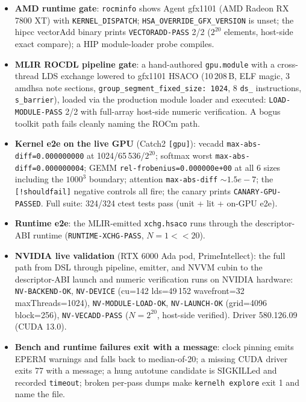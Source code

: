 \documentclass[10pt,twoside]{article}
\begin{document}
\begin{itemize}
  \item \textbf{AMD runtime gate}: \texttt{rocminfo} shows Agent gfx1101 (AMD Radeon RX
        7800 XT) with \texttt{KERNEL\_DISPATCH}; \texttt{HSA\_OVERRIDE\_GFX\_VERSION} is unset;
        the hipcc vectorAdd binary prints \texttt{VECTORADD-PASS} 2/2 ($2^{20}$ elements,
        host-side exact compare); a HIP module-loader probe compiles.
  \item \textbf{MLIR ROCDL pipeline gate}: a hand-authored \texttt{gpu.module} with a
        cross-thread LDS exchange lowered to gfx1101 HSACO (10\,208\,B, ELF magic, 3 amdhsa
        note sections, \texttt{group\_segment\_fixed\_size: 1024}, 8 \texttt{ds\_}
        instructions, \texttt{s\_barrier}), loaded via the production module loader and
        executed: \texttt{LOAD-MODULE-PASS} 2/2 with full-array host-side numeric
        verification. A bogus toolkit path fails cleanly naming the ROCm path.
  \item \textbf{Kernel e2e on the live GPU} (Catch2 \texttt{[gpu]}): vecadd
        \texttt{max-abs-diff=0.000000000} at 1024/65\,536/$2^{20}$; softmax worst
        \texttt{max-abs-diff=0.000000004}; GEMM \texttt{rel-frobenius=0.000000e+00} at all 6
        sizes including the $1000^3$ boundary; attention \texttt{max-abs-diff}
        $\sim 1.5e{-}7$; the \texttt{[!shouldfail]} negative controls all fire; the canary
        prints \texttt{CANARY-GPU-PASSED}. Full suite: 324/324 ctest tests pass (unit + lit
        + on-GPU e2e).
  \item \textbf{Runtime e2e}: the MLIR-emitted \texttt{xchg.hsaco} runs through the
        descriptor-ABI runtime (\texttt{RUNTIME-XCHG-PASS}, $N=1<<20$).
  \item \textbf{NVIDIA live validation} (RTX 6000 Ada pod, PrimeIntellect): the full path from
        DSL through pipeline, emitter, and NVVM cubin to the descriptor-ABI launch and numeric
        verification runs on NVIDIA hardware: \texttt{NV-BACKEND-OK}, \texttt{NV-DEVICE}
        (cu=142 lds=49\,152 wavefront=32 maxThreads=1024), \texttt{NV-MODULE-LOAD-OK},
        \texttt{NV-LAUNCH-OK} (grid=4096 block=256), \texttt{NV-VECADD-PASS} ($N{=}2^{20}$,
        host-side verified). Driver 580.126.09 (CUDA 13.0).
  \item \textbf{Bench and runtime failures exit with a message}: clock pinning emits EPERM
        warnings and falls back to median-of-20; a missing CUDA driver exits 77 with a
        message; a hung autotune candidate is SIGKILLed and recorded \texttt{timeout}; broken
        per-pass dumps make \texttt{kernelh explore} exit 1 and name the file.
\end{itemize}
\end{document}
